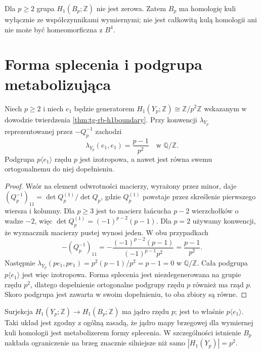 \begin{uwaga}
Dla $p\geq2$ grupa $H_1(B_p;\mathbb Z)$
nie jest zerowa. Zatem $B_p$ ma homologię kuli
wyłącznie ze współczynnikami wymiernymi;
nie jest całkowitą kulą homologii ani
nie może być homeomorficzna z $B^4$.
\end{uwaga}

\section{Forma splecenia i podgrupa metabolizująca}
\label{sec:tg-rb-linkingform}

\begin{stwierdzenie}
\label{prop:tg-rb-linkingform}
Niech $p\geq2$ i niech $e_1$ będzie generatorem
$H_1(Y_p;\mathbb Z)\cong\mathbb Z/p^2\mathbb Z$
wskazanym w dowodzie twierdzenia
\ref{thm:tg-rb-h1boundary}. Przy konwencji
$\lambda_{Y_p}$ reprezentowanej przez $-Q_p^{-1}$
zachodzi
\[
\lambda_{Y_p}(e_1,e_1)=\frac{p-1}{p^2}
\quad\text{w }\mathbb Q/\mathbb Z.
\]
Podgrupa $p\langle e_1\rangle$ rzędu $p$ jest
izotropowa, a nawet jest równa swemu ortogonalnemu
do niej dopełnieniu.
\end{stwierdzenie}

\begin{proof}
Wzór na element odwrotności macierzy, wyrażony
przez minor, daje
$(Q_p^{-1})_{11}=\det Q_p^{(1)}/\det Q_p$,
gdzie $Q_p^{(1)}$ powstaje przez skreślenie pierwszego
wiersza i kolumny. Dla $p\geq3$ jest to
macierz łańcucha $p-2$ wierzchołków o wadze $-2$,
więc $\det Q_p^{(1)}=(-1)^{p-2}(p-1)$.
Dla $p=2$ używamy konwencji, że wyznacznik
macierzy pustej wynosi jeden. W obu przypadkach
\[
-(Q_p^{-1})_{11}=-\frac{(-1)^{p-2}(p-1)}{(-1)^{p-1}p^2}
=\frac{p-1}{p^2}.
\]
Następnie
$\lambda_{Y_p}(pe_1,pe_1)=p^2(p-1)/p^2=p-1=0$
w $\mathbb Q/\mathbb Z$. Cała podgrupa
$p\langle e_1\rangle$ jest więc izotropowa.
Forma splecenia jest niezdegenerowana na grupie
rzędu $p^2$, dlatego dopełnienie ortogonalne
podgrupy rzędu $p$ również ma rząd $p$.
Skoro podgrupa jest zawarta w swoim dopełnieniu,
to oba zbiory są równe.
\end{proof}

\begin{uwaga}
Surjekcja $H_1(Y_p;\mathbb Z)\to H_1(B_p;\mathbb Z)$
ma jądro rzędu $p$; jest to właśnie
$p\langle e_1\rangle$.
Taki układ jest zgodny z ogólną zasadą,
że jądro mapy brzegowej dla wymiernej kuli homologii
jest metabolizerem formy splecenia.
W szczególności istnienie $B_p$ nakłada ograniczenie
na brzeg znacznie silniejsze niż samo $|H_1(Y_p)|=p^2$.
\end{uwaga}

